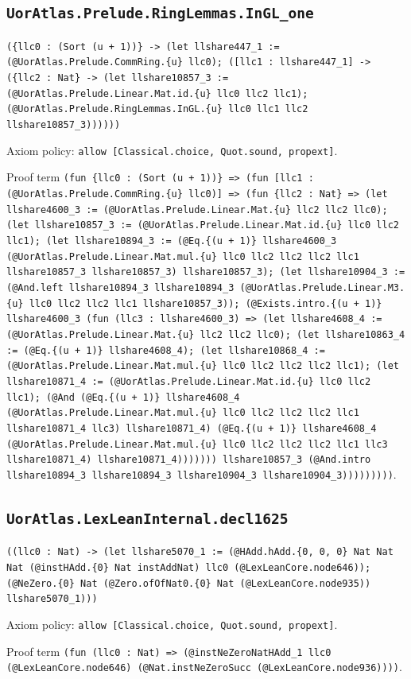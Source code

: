 \documentclass[11pt]{article}
\begin{document}
\subsection*{\texttt{UorAtlas.Prelude.RingLemmas.InGL\_one}}
\noindent\texttt{(\{llc0 : (Sort (u + 1))\} -> (let llshare447\_1 := (@UorAtlas.Prelude.CommRing.\{u\} llc0); ([llc1 : llshare447\_1] -> (\{llc2 : Nat\} -> (let llshare10857\_3 := (@UorAtlas.Prelude.Linear.Mat.id.\{u\} llc0 llc2 llc1); (@UorAtlas.Prelude.RingLemmas.InGL.\{u\} llc0 llc1 llc2 llshare10857\_3))))))}\par
\noindent Axiom policy: \texttt{allow [Classical.choice, Quot.sound, propext]}.\par
\noindent Proof term \texttt{(fun \{llc0 : (Sort (u + 1))\} => (fun [llc1 : (@UorAtlas.Prelude.CommRing.\{u\} llc0)] => (fun \{llc2 : Nat\} => (let llshare4600\_3 := (@UorAtlas.Prelude.Linear.Mat.\{u\} llc2 llc2 llc0); (let llshare10857\_3 := (@UorAtlas.Prelude.Linear.Mat.id.\{u\} llc0 llc2 llc1); (let llshare10894\_3 := (@Eq.\{(u + 1)\} llshare4600\_3 (@UorAtlas.Prelude.Linear.Mat.mul.\{u\} llc0 llc2 llc2 llc2 llc1 llshare10857\_3 llshare10857\_3) llshare10857\_3); (let llshare10904\_3 := (@And.left llshare10894\_3 llshare10894\_3 (@UorAtlas.Prelude.Linear.M3.\{u\} llc0 llc2 llc2 llc1 llshare10857\_3)); (@Exists.intro.\{(u + 1)\} llshare4600\_3 (fun (llc3 : llshare4600\_3) => (let llshare4608\_4 := (@UorAtlas.Prelude.Linear.Mat.\{u\} llc2 llc2 llc0); (let llshare10863\_4 := (@Eq.\{(u + 1)\} llshare4608\_4); (let llshare10868\_4 := (@UorAtlas.Prelude.Linear.Mat.mul.\{u\} llc0 llc2 llc2 llc2 llc1); (let llshare10871\_4 := (@UorAtlas.Prelude.Linear.Mat.id.\{u\} llc0 llc2 llc1); (@And (@Eq.\{(u + 1)\} llshare4608\_4 (@UorAtlas.Prelude.Linear.Mat.mul.\{u\} llc0 llc2 llc2 llc2 llc1 llshare10871\_4 llc3) llshare10871\_4) (@Eq.\{(u + 1)\} llshare4608\_4 (@UorAtlas.Prelude.Linear.Mat.mul.\{u\} llc0 llc2 llc2 llc2 llc1 llc3 llshare10871\_4) llshare10871\_4))))))) llshare10857\_3 (@And.intro llshare10894\_3 llshare10894\_3 llshare10904\_3 llshare10904\_3)))))))))}.\par
\subsection*{\texttt{UorAtlas.LexLeanInternal.decl1625}}
\noindent\texttt{((llc0 : Nat) -> (let llshare5070\_1 := (@HAdd.hAdd.\{0, 0, 0\} Nat Nat Nat (@instHAdd.\{0\} Nat instAddNat) llc0 (@LexLeanCore.node646)); (@NeZero.\{0\} Nat (@Zero.ofOfNat0.\{0\} Nat (@LexLeanCore.node935)) llshare5070\_1)))}\par
\noindent Axiom policy: \texttt{allow [Classical.choice, Quot.sound, propext]}.\par
\noindent Proof term \texttt{(fun (llc0 : Nat) => (@instNeZeroNatHAdd\_1 llc0 (@LexLeanCore.node646) (@Nat.instNeZeroSucc (@LexLeanCore.node936))))}.\par
\end{document}
